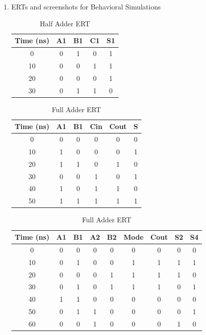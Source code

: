 \documentclass[11pt]{article}
\begin{document}
\begin{enumerate}
	\item ERTs and screenshots for Behavioral Simulations 
	
\begin{table}[ht]\centering
	\caption{Half Adder ERT}
	\label{tbl:Half_Adder_ERT}
	\begin{tabular}{c||cc|cc}
		\toprule
		Time (ns) & A1 & B1 & C1 & S1\\
		\midrule
		0 & 0 & 1 & 0 & 1\\
		10 & 0 & 0 & 1 & 1\\
		20 & 0 & 0 & 0 & 1\\
		30 & 0 & 1 & 1 & 0\\
		\bottomrule
	\end{tabular} 
\end{table} 

\begin{table}[ht]\centering
	\caption{Full Adder ERT}
	\label{tbl:Half_Adder_ERT}
	\begin{tabular}{c||ccc|cc}
		\toprule
		Time (ns) & A1 & B1 & Cin & Cout & S\\
		\midrule
		0 & 0 & 0 & 0 & 0 & 0\\
		10 & 1 & 0 & 0 & 0 & 1\\
		20 & 1 & 1 & 0 & 1 & 0\\
		30 & 0 & 0 & 1 & 0 & 1\\
		40 & 1 & 0 & 1 & 1 & 0\\
		50 & 1 & 1 & 1 & 1 & 1\\
		\bottomrule
	\end{tabular} 
\end{table} 

\begin{table}[ht]\centering
	\caption{Full Adder ERT}
	\label{tbl:Half_Adder_ERT}
	\begin{tabular}{c||ccccc|ccc}
		\toprule
		Time (ns) & A1 & B1 & A2 & B2 & Mode & Cout & S2 & S4\\
		\midrule
		0 & 0 & 0 & 0 & 0 & 0 & 0 & 0 & 0\\
		10 & 0 & 1 & 0 & 0 & 1 & 1 & 1 & 1\\
		20 & 0 & 0 & 0 & 1 & 1 & 1 & 1 & 0\\
		30 & 0 & 1 & 0 & 1 & 1 & 1 & 0 & 1\\
		40 & 1 & 1 & 0 & 0 & 0 & 0 & 0 & 0\\
		50 & 0 & 1 & 1 & 0 & 0 & 0 & 0 & 1\\
		60 & 0 & 0 & 1 & 0 & 0 & 0 & 1 & 0\\	
		\bottomrule
	\end{tabular} 
\end{table} 


\end{enumerate}
\end{document}

